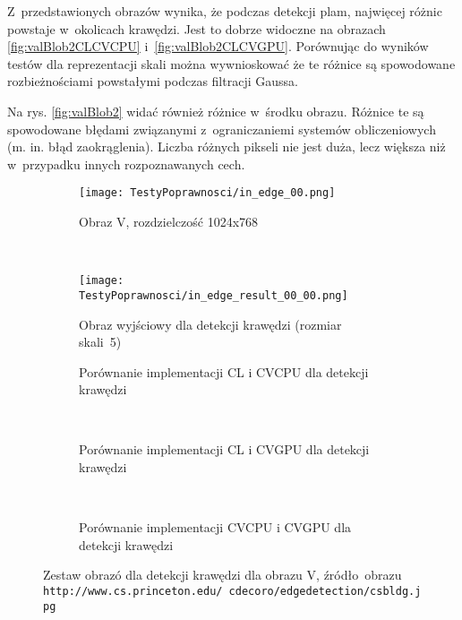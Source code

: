 Z~przedstawionych obrazów wynika, że podczas detekcji plam, najwięcej różnic powstaje w~okolicach krawędzi. Jest to dobrze widoczne na obrazach \ref{fig:valBlob2CLCVCPU} i~\ref{fig:valBlob2CLCVGPU}. Porównując do wyników testów dla reprezentacji skali można wywnioskować że te różnice są spowodowane rozbieżnościami powstałymi podczas filtracji Gaussa.

Na rys. \ref{fig:valBlob2} widać również różnice w~środku obrazu. Różnice te są spowodowane błędami związanymi z~ograniczaniemi systemów obliczeniowych (m. in. błąd zaokrąglenia). Liczba różnych pikseli nie jest duża, lecz większa niż w~przypadku innych rozpoznawanych cech.


\begin{figure}[h]

\begin{center}
\begin{subfigure}[t]{0.3\textwidth}
\texttt{[image: TestyPoprawnosci/in\_edge\_00.png]}
\caption{Obraz V, rozdzielczość 1024x768}
\label{fig:valEdge00}
\end{subfigure}
~
\begin{subfigure}[t]{0.3\textwidth}
\texttt{[image: TestyPoprawnosci/in\_edge\_result\_00\_00.png]}
\caption{Obraz wyjściowy dla detekcji krawędzi (rozmiar skali~5)}
\label{fig:valEdgeResult00}
\end{subfigure}
\end{center}

\begin{subfigure}[t]{0.3\textwidth}
	\centering
	\setlength\fboxsep{0pt}
	\setlength\fboxrule{0.5pt}
	\caption{Porównanie implementacji CL i CVCPU dla detekcji krawędzi}
	\label{fig:valEdge0CLCVCPU}
\end{subfigure}
~
\begin{subfigure}[t]{0.3\textwidth}
	\centering
	\setlength\fboxsep{0pt}
	\setlength\fboxrule{0.5pt}
	\caption{Porównanie implementacji CL i CVGPU dla detekcji krawędzi}
	\label{fig:valEdge0CLCVGPU}
\end{subfigure}
~
\begin{subfigure}[t]{0.3\textwidth}
	\centering
	\setlength\fboxsep{0pt}
	\setlength\fboxrule{0.5pt}
	\caption{Porównanie implementacji CVCPU i CVGPU dla detekcji krawędzi}
	\label{fig:valEdge0CVCPUCVGPU}                 
\end{subfigure}
\caption{Zestaw obrazó dla detekcji krawędzi dla obrazu V, \tiny{źródło~obrazu \texttt{http://www.cs.princeton.edu/~cdecoro/edgedetection/csbldg.jpg}}}

\label{fig:valEdge0}
\end{figure}

